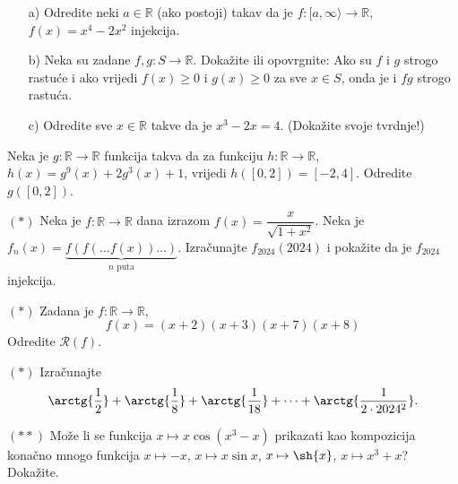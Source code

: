\begin{exercise} \textbf{}
\begin{itemize}
\item[a)] Odredite neki $a\in\mathbb{R}$ (ako postoji) takav da je $f : [a, \infty\rangle\to \mathbb{R}$, $f(x)=x^4-2x^2$ injekcija.
\item[b)] Neka su zadane $f, g : S\to \mathbb{R}$. Dokažite ili opovrgnite: Ako su $f$ i $g$ strogo rastuće i ako vrijedi $f(x)\geq 0$ i $g(x)\geq 0$ za sve $x\in S$, onda je i $fg$ strogo rastuća.
\item[c)] Odredite sve $x\in \mathbb{R}$ takve da je $x^3-2x=4$. (Dokažite svoje tvrdnje!)
\end{itemize}
\end{exercise}
\begin{exercise}
Neka je $g : \mathbb{R}\to \mathbb{R}$ funkcija takva da za funkciju $h : \mathbb{R}\to \mathbb{R}$, $h(x)=g^9(x)+2g^3(x)+1$, vrijedi $h\left([0, 2]\right)=[-2, 4]$. Odredite $g\left([0, 2]\right)$.
\end{exercise}
\begin{exercise} $(*)$
Neka je $f : \mathbb{R}\to \mathbb{R}$ dana izrazom $f(x)=\dfrac{x}{\sqrt{1+x^2}}$. Neka je $f_n(x)=\underbrace{f(f(\dots f(x))\dots)}_\text{$n$ puta}$. Izračunajte $f_{2024}(2024)$ i pokažite da je $f_{2024}$ injekcija.
\end{exercise}
\begin{exercise} $(*)$
Zadana je $f : \mathbb{R}\to \mathbb{R}$,
$$f(x)=(x+2)(x+3)(x+7)(x+8)$$
Odredite $\mathcal{R}(f)$.
\end{exercise}
\begin{exercise} $(*)$ Izračunajte
$$\arctg{\dfrac{1}{2}}+\arctg{\dfrac{1}{8}}+\arctg{\dfrac{1}{18}}+\dots+ \arctg{\dfrac{1}{2\cdot 2024^2}}.$$
\end{exercise}
\begin{exercise} $(**)$
Može li se funkcija $x\mapsto x\cos(x^3-x)$ prikazati kao kompozicija konačno mnogo funkcija $x\mapsto -x$, $x\mapsto x\sin{x}$, $x\mapsto \sh{x}$, $x\mapsto x^3+x$? Dokažite.
\end{exercise}

